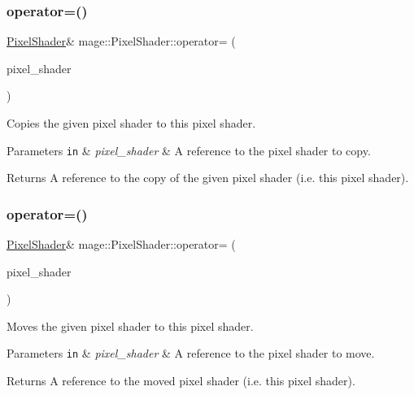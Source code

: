 \subsubsection{\texorpdfstring{operator=()}{operator=()}\hspace{0.1cm}{\footnotesize\ttfamily [1/2]}}
{\footnotesize\ttfamily \hyperlink{classmage_1_1_pixel_shader}{Pixel\+Shader}\& mage\+::\+Pixel\+Shader\+::operator= (\begin{DoxyParamCaption}\item[{const \hyperlink{classmage_1_1_pixel_shader}{Pixel\+Shader} \&}]{pixel\+\_\+shader }\end{DoxyParamCaption})\hspace{0.3cm}{\ttfamily [delete]}}

Copies the given pixel shader to this pixel shader.


\begin{DoxyParams}[1]{Parameters}
\mbox{\tt in}  & {\em pixel\+\_\+shader} & A reference to the pixel shader to copy. \\
\hline
\end{DoxyParams}
\begin{DoxyReturn}{Returns}
A reference to the copy of the given pixel shader (i.\+e. this pixel shader). 
\end{DoxyReturn}
\hypertarget{classmage_1_1_pixel_shader_aaeab6f6fda7d6e1f7d333da03d58daf9}{}\label{classmage_1_1_pixel_shader_aaeab6f6fda7d6e1f7d333da03d58daf9} 
\subsubsection{\texorpdfstring{operator=()}{operator=()}\hspace{0.1cm}{\footnotesize\ttfamily [2/2]}}
{\footnotesize\ttfamily \hyperlink{classmage_1_1_pixel_shader}{Pixel\+Shader}\& mage\+::\+Pixel\+Shader\+::operator= (\begin{DoxyParamCaption}\item[{\hyperlink{classmage_1_1_pixel_shader}{Pixel\+Shader} \&\&}]{pixel\+\_\+shader }\end{DoxyParamCaption})\hspace{0.3cm}{\ttfamily [delete]}}

Moves the given pixel shader to this pixel shader.


\begin{DoxyParams}[1]{Parameters}
\mbox{\tt in}  & {\em pixel\+\_\+shader} & A reference to the pixel shader to move. \\
\hline
\end{DoxyParams}
\begin{DoxyReturn}{Returns}
A reference to the moved pixel shader (i.\+e. this pixel shader). 
\end{DoxyReturn}
\hypertarget{classmage_1_1_pixel_shader_ab677013145ca252c57e5a001134c01ff}{}\label{classmage_1_1_pixel_shader_ab677013145ca252c57e5a001134c01ff} 
